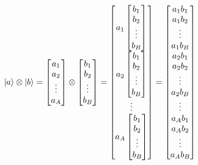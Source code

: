 \begin{equation}
    \ket{a} \otimes \ket{b} = 
    \begin{bmatrix}
        a_1 \\
        a_2 \\
        \vdots \\
        a_A
    \end{bmatrix} 
    \otimes 
    \begin{bmatrix}
        b_1 \\
        b_2 \\
        \vdots \\
        b_B
    \end{bmatrix}
    = 
    \begin{bmatrix}
        a_1 \begin{bmatrix}
        b_1 \\
        b_2 \\
        \vdots \\
        b_B
        \end{bmatrix} \\
        a_2 \begin{bmatrix}
        b_1 \\
        b_2 \\
        \vdots \\
        b_B
        \end{bmatrix} \\
        \vdots \\
        a_A \begin{bmatrix}
        b_1 \\
        b_2 \\
        \vdots \\
        b_B
        \end{bmatrix}
    \end{bmatrix}
    =
    \begin{bmatrix}
        a_1 b_1 \\
        a_1 b_2 \\
        \vdots \\
        a_1 b_B \\
        a_2 b_1 \\
        a_2 b_2 \\
        \vdots \\
        a_2 b_B \\
        \vdots \\
        a_A b_1 \\
        a_A b_2 \\
        \vdots \\
        a_A b_B
    \end{bmatrix}
\end{equation}

